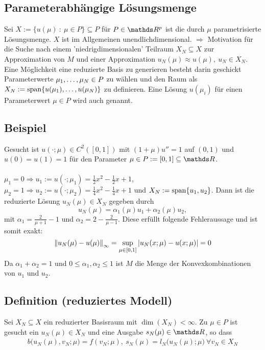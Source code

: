 \subsection{Parameterabhängige Lösungsmenge}
\label{sub:para_menge}
Sei $X :=\{u(\mu)~:~\mu\in P\}\subseteq P$ für $P\in \R^p$ ist die durch $\mu$ parametrisierte Lösungsmenge.
$X$ ist im Allgemeinen unendlichdimensional.
$\Rightarrow$ Motivation für die Suche nach einem 'niedrigdimensionalen' Teilraum $X_N\subseteq X$ zur Approximation von $M$ und einer Approximation $u_N(\mu) \approx u(\mu),~ u_N\in X_N$.
Eine Möglichkeit eine reduzierte Basis zu generieren besteht darin geschickt Parameterwerte $\mu_1, \dots ,\mu_N\in P$ zu wählen und den Raum als $X_N := \operatorname{span}\{u(\mu_1), \dots ,u(\mu_N)\}$ zu definieren.
Eine Lösung $u(\mu_i)$ für einen Parameterwert $\mu\in P$ wird auch  genannt.

\subsection{Beispiel}
\label{sub:beispiel_1}
Gesucht ist $u(\cdot;\mu) \in C^2([0,1])$ mit $(1+\mu)u'' = 1$ auf $(0,1)$ und $u(0)=u(1)=1$ für den Parameter $\mu\in P:= [0,1]\subseteq \R$.\\
\\
$\mu_1 = 0 \Rightarrow u_1 := u(\cdot;\mu_1) = \frac{1}{2} x^2- \frac{1}{2}x +1$, $\mu_2 = 1 \Rightarrow u_2 := u(\cdot;\mu_2) = \frac{1}{4} x^2- \frac{1}{4}x +1$ und $X_N := \operatorname{span}\{u_1,u_2\}$.
Dann ist die reduzierte Lösung $u_N(\mu)\in X_N$ gegeben durch
\[
u_N(\mu) = \alpha_1(\mu)u_1 +\alpha_2(\mu) u_2,
\]
mit $\alpha_1 = \frac{2}{\mu+1}-1$ und $\alpha_2 = 2-\frac{2}{\mu-1}$.
Diese erfüllt folgende Fehleraussage und ist somit exakt:
\[
\left\Vert u_N(\mu)-u(\mu)\right\Vert_\infty = \sup\limits_{\mu\in[0,1]} \left\vert u_N(x;\mu)-u(x;\mu)\right\vert = 0
\]
Da $\alpha_1 + \alpha_2 = 1$ und $0\le \alpha_1,\alpha_2\le 1$ ist $M$ die Menge der Konvexkombinationen von $u_1$ und $u_2$.

\subsection{Definition (reduziertes Modell)}
\label{sub:reduziertes_modell}
Sei $X_N\subseteq X$ ein reduzierter Basisraum mit $\dim(X_N)<\infty$.
Zu $\mu\in P$ ist gesucht ein $u_N(\mu)\in X_N$ und eine Ausgabe $s_N(\mu)\in \R$, so dass
\begin{align}
b\big(u_N(\mu),v_N;\mu\big) = f(v_N;\mu),~ s_N(\mu) = l_N\big(u_N(\mu);\mu\big) ~ \forall v_N\in X_N
\end{align}

